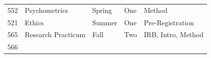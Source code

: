 \documentclass[openany]{book}
\begin{document}
\begin{longtable}[]{@{}lllll@{}}
\begin{minipage}[t]{0.03\columnwidth}
552\strut
\end{minipage} & \begin{minipage}[t]{0.27\columnwidth}\raggedright
Psychometrics\strut
\end{minipage} & \begin{minipage}[t]{0.26\columnwidth}\raggedright
Spring\strut
\end{minipage} & \begin{minipage}[t]{0.10\columnwidth}\raggedright
One\strut
\end{minipage} & \begin{minipage}[t]{0.19\columnwidth}\raggedright
Method\strut
\end{minipage}\tabularnewline
\begin{minipage}[t]{0.03\columnwidth}\raggedright
521\strut
\end{minipage} & \begin{minipage}[t]{0.27\columnwidth}\raggedright
Ethics\strut
\end{minipage} & \begin{minipage}[t]{0.26\columnwidth}\raggedright
Summer\strut
\end{minipage} & \begin{minipage}[t]{0.10\columnwidth}\raggedright
One\strut
\end{minipage} & \begin{minipage}[t]{0.19\columnwidth}\raggedright
Pre-Registration\strut
\end{minipage}\tabularnewline
\begin{minipage}[t]{0.03\columnwidth}\raggedright
565\strut
\end{minipage} & \begin{minipage}[t]{0.27\columnwidth}\raggedright
Research Practicum\strut
\end{minipage} & \begin{minipage}[t]{0.26\columnwidth}\raggedright
Fall\strut
\end{minipage} & \begin{minipage}[t]{0.10\columnwidth}\raggedright
Two\strut
\end{minipage} & \begin{minipage}[t]{0.19\columnwidth}\raggedright
IRB, Intro, Method\strut
\end{minipage}\tabularnewline
\begin{minipage}[t]{0.03\columnwidth}\raggedright
566\strut
\end{minipage} & \begin{minipage}[t]{0.27\columnwidth}\raggedright

\end{minipage}
\end{longtable}
\end{document}
